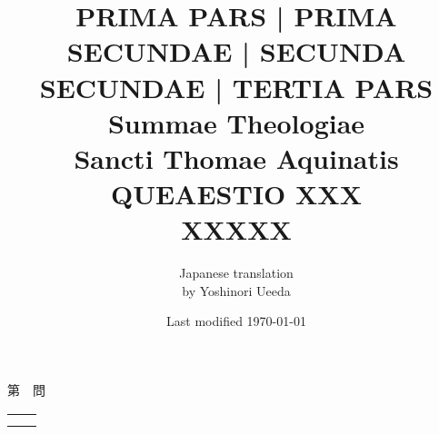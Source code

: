 \documentclass[10pt]{jsarticle}
\title{{\bf PRIMA PARS | PRIMA SECUNDAE | SECUNDA SECUNDAE | TERTIA PARS}\\{\HUGE Summae Theologiae}\\Sancti Thomae
Aquinatis\\{\sffamily QUEAESTIO XXX}\\XXXXX}
\author{Japanese translation\\by Yoshinori {\sc Ueeda}}
\date{Last modified \today}
\begin{document}
\maketitle
\pagestyle{fancy}

\begin{center}
{\Large 第　問\\}
\end{center}

\begin{longtable}{p{21em}p{21em}}


&



\\



&

 

\end{longtable}

\newpage
\end{document}
